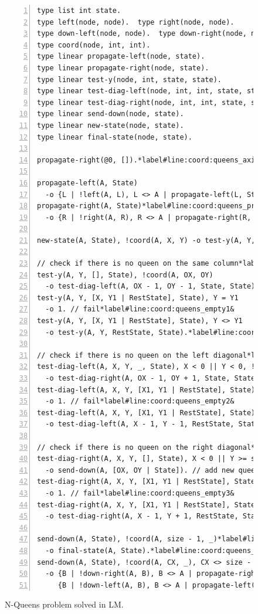 \begin{figure}[h!]
\begin{Verbatim}[numbers=left,fontsize=\scriptsize,commandchars=\*\#\&]
type list int state.
type left(node, node).  type right(node, node).
type down-left(node, node).  type down-right(node, node).
type coord(node, int, int).
type linear propagate-left(node, state).
type linear propagate-right(node, state).
type linear test-y(node, int, state, state).
type linear test-diag-left(node, int, int, state, state).
type linear test-diag-right(node, int, int, state, state).
type linear send-down(node, state).
type linear new-state(node, state).
type linear final-state(node, state).

propagate-right(@0, []).*label#line:coord:queens_axiom&

propagate-left(A, State)
  -o {L | !left(A, L), L <> A | propagate-left(L, State)}, new-state(A, State).
propagate-right(A, State)*label#line:coord:queens_propr1&
  -o {R | !right(A, R), R <> A | propagate-right(R, State)}, new-state(A, State).*label#line:coord:queens_propr2&

new-state(A, State), !coord(A, X, Y) -o test-y(A, Y, State, State).

// check if there is no queen on the same column*label#line:coord:queens_col1&
test-y(A, Y, [], State), !coord(A, OX, OY)
  -o test-diag-left(A, OX - 1, OY - 1, State, State).
test-y(A, Y, [X, Y1 | RestState], State), Y = Y1
  -o 1. // fail*label#line:coord:queens_empty1&
test-y(A, Y, [X, Y1 | RestState], State), Y <> Y1
  -o test-y(A, Y, RestState, State).*label#line:coord:queens_col2&

// check if there is no queen on the left diagonal*label#line:coord:queens_ldiag1&
test-diag-left(A, X, Y, _, State), X < 0 || Y < 0, !coord(A, OX, OY)
  -o test-diag-right(A, OX - 1, OY + 1, State, State).
test-diag-left(A, X, Y, [X1, Y1 | RestState], State), X = X1, Y = Y1
  -o 1. // fail*label#line:coord:queens_empty2&
test-diag-left(A, X, Y, [X1, Y1 | RestState], State), X <> X1 || Y <> Y1
  -o test-diag-left(A, X - 1, Y - 1, RestState, State).*label#line:coord:queens_ldiag2&

// check if there is no queen on the right diagonal*label#line:coord:queens_rdiag1&
test-diag-right(A, X, Y, [], State), X < 0 || Y >= size, !coord(A, OX, OY)
  -o send-down(A, [OX, OY | State]). // add new queen*label#line:coord:queens_add&
test-diag-right(A, X, Y, [X1, Y1 | RestState], State), X = X1, Y = Y1
  -o 1. // fail*label#line:coord:queens_empty3&
test-diag-right(A, X, Y, [X1, Y1 | RestState], State), X <> X1 || Y <> Y1
  -o test-diag-right(A, X - 1, Y + 1, RestState, State).*label#line:coord:queens_rdiag2&

send-down(A, State), !coord(A, size - 1, _)*label#line:coord:queens_complete1&
  -o final-state(A, State).*label#line:coord:queens_complete2&
send-down(A, State), !coord(A, CX, _), CX <> size - 1*label#line:coord:queens_down1&
  -o {B | !down-right(A, B), B <> A | propagate-right(B, State)},
     {B | !down-left(A, B), B <> A | propagate-left(B, State)}.*label#line:coord:queens_down2&
\end{Verbatim}
  \caption{N-Queens problem solved in LM.}
  \label{code:coordination:nqueens}
\end{figure}


